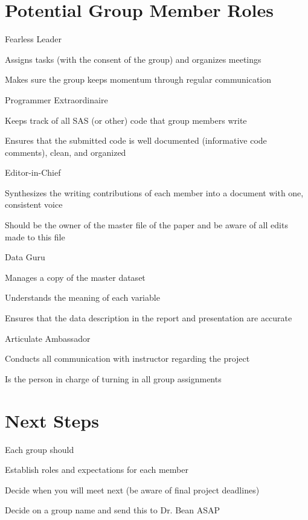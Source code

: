 \documentclass[12pt]{../notes}
\begin{document}
\section{Potential Group Member Roles}
\bi
\item Fearless Leader
\bi
\item Assigns tasks (with the consent of the group) and organizes meetings
\item Makes sure the group keeps momentum through regular communication
\ei
\item Programmer Extraordinaire
\bi
\item Keeps track of all SAS (or other) code that group members write
\item Ensures that the submitted code is well documented (informative code comments), clean, and organized
\ei
\item Editor-in-Chief
\bi
\item Synthesizes the writing contributions of each member into a document with one, consistent voice
\item Should be the owner of the master file of the paper and be aware of all edits made to this file
\ei
\item Data Guru
\bi
\item Manages a copy of the master dataset
\item Understands the meaning of each variable
\item Ensures that the data description in the report and presentation are accurate
\ei
\item Articulate Ambassador
\bi
\item Conducts all communication with instructor regarding the project
\item Is the person in charge of turning in all group assignments
\ei
\ei

\section{Next Steps}
Each group should
\bi
\item Establish roles and expectations for each member
\item Decide when you will meet next (be aware of final project deadlines)
\item Decide on a group name and send this to Dr. Bean ASAP
\ei
\end{document}
